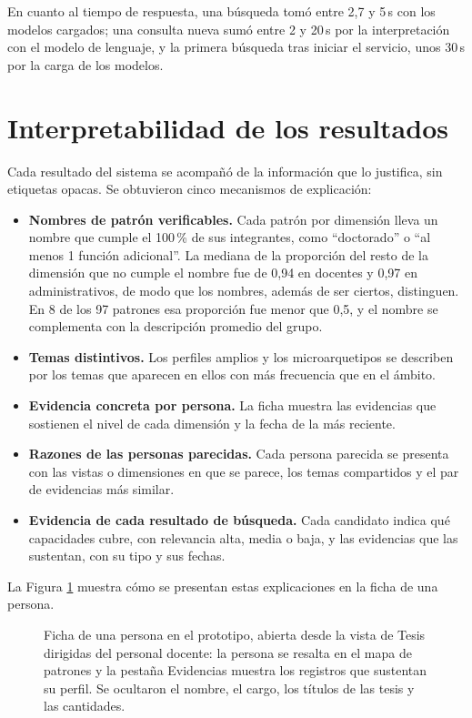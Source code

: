 En cuanto al tiempo de respuesta, una búsqueda tomó entre 2,7 y 5\,s con los modelos cargados; una consulta nueva sumó entre 2 y 20\,s por la interpretación con el modelo de lenguaje, y la primera búsqueda tras iniciar el servicio, unos 30\,s por la carga de los modelos.

\section{Interpretabilidad de los resultados}
\label{sec:res_interpretabilidad}

Cada resultado del sistema se acompañó de la información que lo justifica, sin etiquetas opacas. Se obtuvieron cinco mecanismos de explicación:

\begin{itemize}
    \item \textbf{Nombres de patrón verificables.} Cada patrón por dimensión lleva un nombre que cumple el 100\,\% de sus integrantes, como ``doctorado'' o ``al menos 1 función adicional''. La mediana de la proporción del resto de la dimensión que no cumple el nombre fue de 0,94 en docentes y 0,97 en administrativos, de modo que los nombres, además de ser ciertos, distinguen. En 8 de los 97 patrones esa proporción fue menor que 0,5, y el nombre se complementa con la descripción promedio del grupo.
    \item \textbf{Temas distintivos.} Los perfiles amplios y los microarquetipos se describen por los temas que aparecen en ellos con más frecuencia que en el ámbito.
    \item \textbf{Evidencia concreta por persona.} La ficha muestra las evidencias que sostienen el nivel de cada dimensión y la fecha de la más reciente.
    \item \textbf{Razones de las personas parecidas.} Cada persona parecida se presenta con las vistas o dimensiones en que se parece, los temas compartidos y el par de evidencias más similar.
    \item \textbf{Evidencia de cada resultado de búsqueda.} Cada candidato indica qué capacidades cubre, con relevancia alta, media o baja, y las evidencias que las sustentan, con su tipo y sus fechas.
\end{itemize}

La Figura \ref{fig:ficha} muestra cómo se presentan estas explicaciones en la ficha de una persona.

\begin{figure}[!htbp]
    \centering
    \caption{Ficha de una persona en el prototipo, abierta desde la vista de Tesis dirigidas del personal docente: la persona se resalta en el mapa de patrones y la pestaña Evidencias muestra los registros que sustentan su perfil. Se ocultaron el nombre, el cargo, los títulos de las tesis y las cantidades.}
    \label{fig:ficha}
\end{figure}

